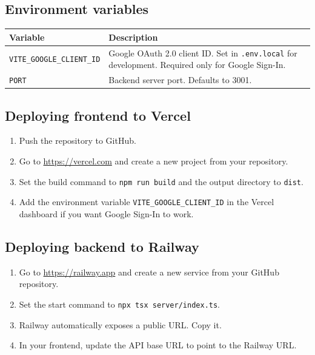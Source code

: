\documentclass[12pt,a4paper]{article}
\begin{document}
\subsection{Environment variables}

\begin{center}
\begin{tabular}{L{5.5cm} L{8cm}}
  \toprule
  \textbf{Variable} & \textbf{Description} \\
  \midrule
  \texttt{VITE\_GOOGLE\_CLIENT\_ID} & Google OAuth 2.0 client ID. Set in \texttt{.env.local} for development. Required only for Google Sign-In. \\
  \texttt{PORT} & Backend server port. Defaults to 3001. \\
  \bottomrule
\end{tabular}
\end{center}

\subsection{Deploying frontend to Vercel}

\begin{enumerate}
  \item Push the repository to GitHub.
  \item Go to \url{https://vercel.com} and create a new project from your repository.
  \item Set the build command to \texttt{npm run build} and the output directory to \texttt{dist}.
  \item Add the environment variable \texttt{VITE\_GOOGLE\_CLIENT\_ID} in the Vercel dashboard if you want Google Sign-In to work.
\end{enumerate}

\subsection{Deploying backend to Railway}

\begin{enumerate}
  \item Go to \url{https://railway.app} and create a new service from your GitHub repository.
  \item Set the start command to \texttt{npx tsx server/index.ts}.
  \item Railway automatically exposes a public URL. Copy it.
  \item In your frontend, update the API base URL to point to the Railway URL.
\end{enumerate}
\end{document}
